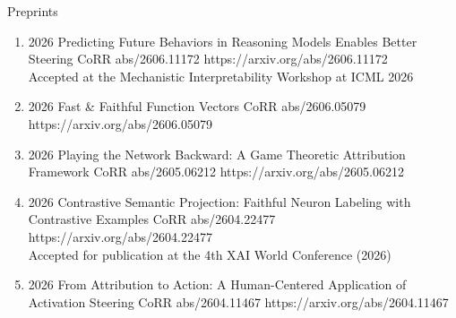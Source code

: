 \headedsubsection %
{Preprints}{}
{
    \begin{enumerate}

        \item {}
                        {2026}
                        {Predicting Future Behaviors in Reasoning Models Enables Better Steering}
                        {CoRR abs/2606.11172}
                        {https://arxiv.org/abs/2606.11172}
                        {
                            \\ Accepted at the Mechanistic Interpretability Workshop at ICML 2026
                        }


        \item {}
                        {2026}
                        {Fast \& Faithful Function Vectors}
                        {CoRR abs/2606.05079}
                        {https://arxiv.org/abs/2606.05079}


        \item {}
                        {2026}
                        {Playing the Network Backward: A Game Theoretic Attribution Framework}
                        {CoRR abs/2605.06212}
                        {https://arxiv.org/abs/2605.06212}


        \item {}
                        {2026}
                        {Contrastive Semantic Projection: Faithful Neuron Labeling with Contrastive Examples}
                        {CoRR abs/2604.22477}
                        {https://arxiv.org/abs/2604.22477}
                        {
                            \\ Accepted for publication at the 4th XAI World Conference (2026)
                        }


        \item {}
                        {2026}
                        {From Attribution to Action: A Human-Centered Application of Activation Steering}
                        {CoRR abs/2604.11467}
                        {https://arxiv.org/abs/2604.11467}



\end{enumerate}}
